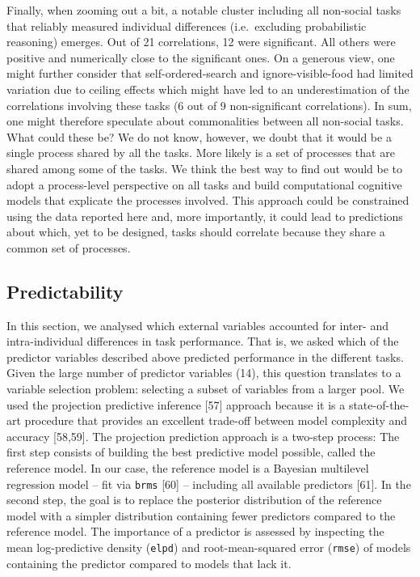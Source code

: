 \documentclass[
  man,floatsintext]{apa6}
\begin{document}
Finally, when zooming out a bit, a notable cluster including all non-social tasks that reliably measured individual differences (i.e.~excluding probabilistic reasoning) emerges. Out of 21 correlations, 12 were significant. All others were positive and numerically close to the significant ones. On a generous view, one might further consider that self-ordered-search and ignore-visible-food had limited variation due to ceiling effects which might have led to an underestimation of the correlations involving these tasks (6 out of 9 non-significant correlations). In sum, one might therefore speculate about commonalities between all non-social tasks. What could these be? We do not know, however, we doubt that it would be a single process shared by all the tasks. More likely is a set of processes that are shared among some of the tasks. We think the best way to find out would be to adopt a process-level perspective on all tasks and build computational cognitive models that explicate the processes involved. This approach could be constrained using the data reported here and, more importantly, it could lead to predictions about which, yet to be designed, tasks should correlate because they share a common set of processes.

\subsection{Predictability}\label{predictability}

In this section, we analysed which external variables accounted for inter- and intra-individual differences in task performance. That is, we asked which of the predictor variables described above predicted performance in the different tasks. Given the large number of predictor variables (14), this question translates to a variable selection problem: selecting a subset of variables from a larger pool. We used the projection predictive inference {[}57{]} approach because it is a state-of-the-art procedure that provides an excellent trade-off between model complexity and accuracy {[}58,59{]}. The projection prediction approach is a two-step process: The first step consists of building the best predictive model possible, called the reference model. In our case, the reference model is a Bayesian multilevel regression model -- fit via \texttt{brms} {[}60{]} -- including all available predictors {[}61{]}. In the second step, the goal is to replace the posterior distribution of the reference model with a simpler distribution containing fewer predictors compared to the reference model. The importance of a predictor is assessed by inspecting the mean log-predictive density (\texttt{elpd}) and root-mean-squared error (\texttt{rmse}) of models containing the predictor compared to models that lack it.
\end{document}
